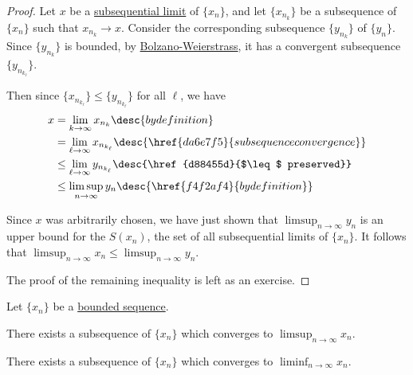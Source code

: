 \begin{proof}
  Let $x$ be a \href{fd942fa}{subsequential limit} of $\{x_n\}$, and let
  $\{x_{n_k}\}$ be a subsequence of $\{x_n\}$ such that $x_{n_k}\to x$. Consider
  the corresponding subsequence $\{y_{n_k}\}$ of $\{y_n\}$. Since $\{y_{n_k}\}$
  is bounded, by \href{d277ad0}{Bolzano-Weierstrass}, it has a convergent
  subsequence $\{y_{n_{k_\ell}}\}$.

  Then since $\{x_{n_{k_\ell}}\}\leq\{y_{n_{k_\ell}}\}$ for all $\ell$, we have
  \begin{align*}
    x &=\lim_{k\to\infty}x_{n_k}\desc{by definition}                                     \\
      &=\lim_{\ell\to\infty}x_{n_{k_\ell}}\desc{\href{da6e7f5}{subsequence convergence}} \\
      &\leq\lim_{\ell\to\infty}y_{n_{k_\ell}}\desc{\href{d88455d}{$\leq$ preserved}}     \\
      &\leq\limsup_{n\to\infty}y_n\desc{\href{f4f2af4}{by definition}}
  \end{align*}

  Since $x$ was arbitrarily chosen, we have just shown that
  $\displaystyle\limsup_{n\to\infty}y_n$ is an upper bound for the $S(x_n)$,
  the set of all subsequential limits of $\{x_n\}$. It follows that
  $\displaystyle\limsup_{n\to\infty}x_n\leq\limsup_{n\to\infty}y_n$.

  The proof of the remaining inequality is left as an exercise.
\end{proof}

\label{d98d9e2}

Let $\{x_n\}$ be a \href{d5ed299}{bounded sequence}.

\begin{enumerati}
  \item There exists a subsequence of $\{x_n\}$ which converges to
        $\displaystyle\limsup_{n\to\infty}x_n$.
  \item There exists a subsequence of $\{x_n\}$ which converges to
        $\displaystyle\liminf_{n\to\infty}x_n$.
\end{enumerati}

